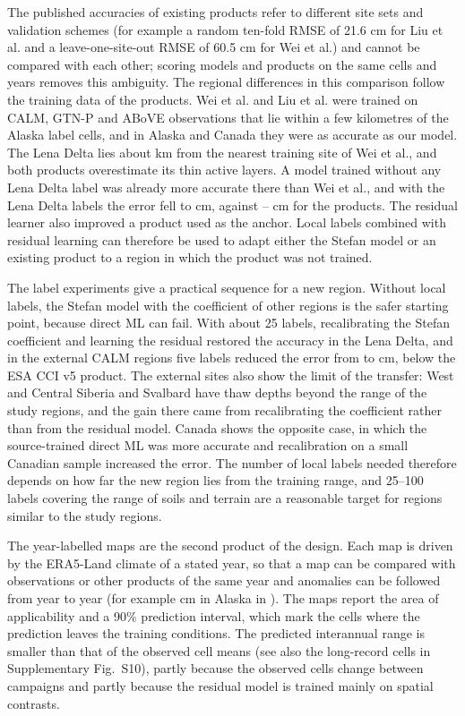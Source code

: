 The published accuracies of existing products refer to different site sets and validation schemes (for example a random ten-fold RMSE of 21.6 cm for Liu et al.\cite{Liu2024} and a leave-one-site-out RMSE of 60.5 cm for Wei et al.\cite{Wei2026}) and cannot be compared with each other; scoring models and products on the same cells and years removes this ambiguity. The regional differences in this comparison follow the training data of the products. Wei et al. and Liu et al. were trained on CALM, GTN-P and ABoVE observations that lie within a few kilometres of the Alaska label cells, and in Alaska and Canada they were as accurate as our model. The Lena Delta lies about \ndistweiLemed{} km from the nearest training site of Wei et al., and both products overestimate its thin active layers. A model trained without any Lena Delta label was already more accurate there than Wei et al., and with the Lena Delta labels the error fell to \nccLeRoall{} cm, against \nccLeCcifiveall--\nccLeWeiall{} cm for the products. The residual learner also improved a product used as the anchor. Local labels combined with residual learning can therefore be used to adapt either the Stefan model or an existing product to a region in which the product was not trained.

The label experiments give a practical sequence for a new region. Without local labels, the Stefan model with the coefficient of other regions is the safer starting point, because direct ML can fail. With about 25 labels, recalibrating the Stefan coefficient and learning the residual restored the accuracy in the Lena Delta, and in the external CALM regions five labels reduced the error from \nftAllRszero{} to \nftAllRsfive{} cm, below the ESA CCI v5 product. The external sites also show the limit of the transfer: West and Central Siberia and Svalbard have thaw depths beyond the range of the study regions, and the gain there came from recalibrating the coefficient rather than from the residual model. Canada shows the opposite case, in which the source-trained direct ML was more accurate and recalibration on a small Canadian sample increased the error. The number of local labels needed therefore depends on how far the new region lies from the training range, and 25--100 labels covering the range of soils and terrain are a reasonable target for regions similar to the study regions.

The year-labelled maps are the second product of the design. Each map is driven by the ERA5-Land climate of a stated year, so that a map can be compared with observations or other products of the same year and anomalies can be followed from year to year (for example \nanmaxAk{} cm in Alaska in \nanmaxyrAk). The maps report the area of applicability and a 90\% prediction interval, which mark the cells where the prediction leaves the training conditions. The predicted interannual range is smaller than that of the observed cell means (see also the long-record cells in Supplementary Fig.~S10), partly because the observed cells change between campaigns and partly because the residual model is trained mainly on spatial contrasts.

